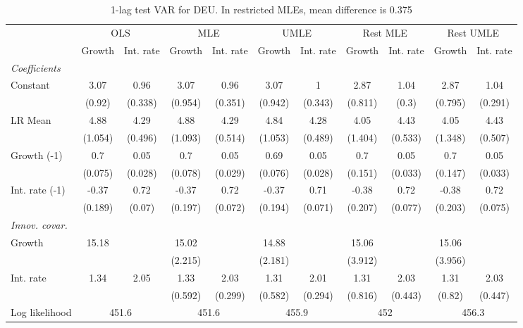 \begin{table}[htbp] 
	\centering
	\begin{tabular}{@{\extracolsep{4pt}}lcccccccccc@{}}		\hline\hline
		 		 & \multicolumn{2}{c}{OLS} &\multicolumn{2}{c}{MLE} &\multicolumn{2}{c}{UMLE} &\multicolumn{2}{c}{Rest MLE} &\multicolumn{2}{c}{Rest UMLE} \\ 
 		 & Growth 	 & Int. rate 	 & Growth 	 & Int. rate 	 & Growth 	 & Int. rate 	 & Growth 	 & Int. rate 	 & Growth 	 & Int. rate\\\cline{2-3}\cline{4-5}\cline{6-7}\cline{8-9}\cline{10-11}
\rule{0pt}{4ex} 
 \emph{Coefficients} 	  		 & 		 & 		 & 		 & 		 & 		 & 		 & 		 & 		 & 		 &\\ 
\quad Constant 	 & 3.07 	 & 0.96 	 & 3.07 	 & 0.96 	 & 3.07 	 & 1 	 & 2.87 	 & 1.04 	 & 2.87 	 & 1.04	 \\ 
 		 & (0.92) 	 & (0.338) 	 & (0.954) 	 & (0.351) 	 & (0.942) 	 & (0.343) 	 & (0.811) 	 & (0.3) 	 & (0.795) 	 & (0.291) 	 \\ 
\quad LR Mean 	 & 4.88 	 & 4.29 	 & 4.88 	 & 4.29 	 & 4.84 	 & 4.28 	 & 4.05 	 & 4.43 	 & 4.05 	 & 4.43	 \\ 
 		 & (1.054) 	 & (0.496) 	 & (1.093) 	 & (0.514) 	 & (1.053) 	 & (0.489) 	 & (1.404) 	 & (0.533) 	 & (1.348) 	 & (0.507) 	 \\ 
\quad Growth (-1) 	 &0.7 	 & 0.05 	 & 0.7 	 & 0.05 	 & 0.69 	 & 0.05 	 & 0.7 	 & 0.05 	 & 0.7 	 & 0.05	 \\ 
 		 & (0.075) 	 & (0.028) 	 & (0.078) 	 & (0.029) 	 & (0.076) 	 & (0.028) 	 & (0.151) 	 & (0.033) 	 & (0.147) 	 & (0.033) 	 \\ 
\quad Int. rate (-1) 	 &-0.37 	 & 0.72 	 & -0.37 	 & 0.72 	 & -0.37 	 & 0.71 	 & -0.38 	 & 0.72 	 & -0.38 	 & 0.72	 \\ 
 		 & (0.189) 	 & (0.07) 	 & (0.197) 	 & (0.072) 	 & (0.194) 	 & (0.071) 	 & (0.207) 	 & (0.077) 	 & (0.203) 	 & (0.075) 	 \\ 
\rule{0pt}{4ex} \emph{Innov. covar.}  	 & 	 & 	 & 	 & 	 & 	 & 	 & 	 & 	 & 	 &\\ 
\quad Growth 	 &15.18 	 &  	 & 15.02 	 &  	 & 14.88 	 &  	 & 15.06 	 &  	 & 15.06 	 & 	 \\ 
 		 &  	 &  	 & (2.215) 	 &  	 & (2.181) 	 &  	 & (3.912) 	 &  	 & (3.956) 	 &  	 \\ 
\quad Int. rate 	 &1.34 	 & 2.05 	 & 1.33 	 & 2.03 	 & 1.31 	 & 2.01 	 & 1.31 	 & 2.03 	 & 1.31 	 & 2.03	 \\ 
 		 &  	 &  	 & (0.592) 	 & (0.299) 	 & (0.582) 	 & (0.294) 	 & (0.816) 	 & (0.443) 	 & (0.82) 	 & (0.447) 	 \\ 
 \hline \rule{0pt}{4ex} 
  Log likelihood 	 &\multicolumn{2}{c}{451.6} 	 & \multicolumn{2}{c}{451.6} 	 & \multicolumn{2}{c}{455.9} 	 & \multicolumn{2}{c}{452} 	 & \multicolumn{2}{c}{456.3}\\ 

 \hline 	\end{tabular}		\caption{1-lag test VAR for DEU. In restricted MLEs, mean difference is 0.375}
		\label{tab:DEU1lag}

\end{table}